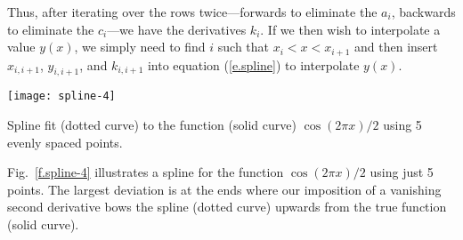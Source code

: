 Thus, after iterating over the rows twice---forwards to eliminate the $a_{i}$, backwards to eliminate the $c_{i}$---we have the derivatives $k_{i}$. If we then wish to interpolate a value $y(x)$, we simply need to find $i$ such that $x_{i}< x < x_{i+1}$ and then insert $x_{i,i+1}$, $y_{i,i+1}$, and $k_{i,i+1}$ into equation (\ref{e.spline}) to interpolate $y(x)$.

\begin{marginfigure}
\texttt{[image: spline-4]}
\caption{\label{f.spline-4} Spline fit (dotted curve) to the function (solid curve) $\cos(2\pi x)/2$ using 5 evenly spaced points.}
\end{marginfigure}
Fig.~\ref{f.spline-4} illustrates a spline for the function $\cos(2\pi x)/2$ using just 5 points. The largest deviation is at the ends where our imposition of a vanishing second derivative bows the spline (dotted curve) upwards from the true function (solid curve).
